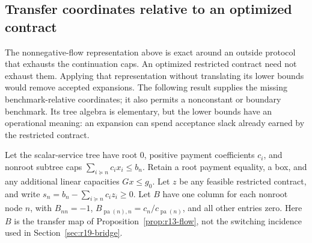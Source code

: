 \documentclass[11pt,letterpaper]{article}
\theoremstyle{definition}
\newcommand{\1}{\mathbf 1}
\begin{document}


\subsection{Transfer coordinates relative to an optimized contract}\label{sec:r24-transfers}
The nonnegative-flow representation above is exact around an outside protocol
that exhausts the continuation caps. An optimized restricted contract need not
exhaust them. Applying that representation without translating its lower bounds
would remove accepted expansions. The following result supplies the missing
benchmark-relative coordinates; it also permits a nonconstant or boundary
benchmark. Its tree algebra is elementary, but the lower bounds have an
operational meaning: an expansion can spend acceptance slack already earned by
the restricted contract.

Let the scalar-service tree have root $0$, positive payment coefficients $c_i$,
and nonroot subtree caps $\sum_{i\succeq n}c_i x_i\leq b_n$.
Retain a root payment equality, a box, and any additional linear capacities
$Gx\leq g_0$. Let $z$ be any feasible restricted contract, and write
$s_n=b_n-\sum_{i\succeq n}c_i z_i\geq0$.
Let $B$ have one column for each nonroot node $n$, with
$B_{nn}=-1$, $B_{\operatorname{pa}(n),n}=c_n/c_{\operatorname{pa}(n)}$,
and all other entries zero. Here $B$ is the transfer map of
Proposition~\ref{prop:r13-flow}, not the switching incidence used in
Section~\ref{sec:r19-bridge}.
\end{document}
